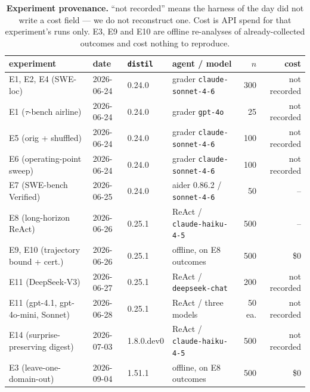 \documentclass[11pt]{article}
\newcommand{\sweEsevenTotalCost}{--}}
\newcommand{\sweEeightTotalCost}{--}}
\begin{document}
\begin{table}[t]
\centering\small
\caption{\textbf{Experiment provenance.} ``not recorded'' means the harness of the day did
not write a cost field --- we do not reconstruct one. Cost is API spend for that
experiment's runs only. E3, E9 and E10 are offline re-analyses of already-collected
outcomes and cost nothing to reproduce.}
\label{tab:provenance}
\begin{tabular}{@{}llllrr@{}}
\toprule
experiment & date & \texttt{distil} & agent / model & $n$ & cost \\
\midrule
E1, E2, E4 (SWE-loc) & 2026-06-24 & 0.24.0 & grader \texttt{claude-sonnet-4-6} & 300 & not recorded \\
E1 ($\tau$-bench airline) & 2026-06-24 & 0.24.0 & grader \texttt{gpt-4o} & 25 & not recorded \\
E5 (orig + shuffled) & 2026-06-24 & 0.24.0 & grader \texttt{claude-sonnet-4-6} & 100 & not recorded \\
E6 (operating-point sweep) & 2026-06-24 & 0.24.0 & grader \texttt{claude-sonnet-4-6} & 100 & not recorded \\
E7 (SWE-bench Verified) & 2026-06-25 & 0.24.0 & aider 0.86.2 / \texttt{sonnet-4-6} & 50 & \sweEsevenTotalCost \\
E8 (long-horizon ReAct) & 2026-06-26 & 0.25.1 & ReAct / \texttt{claude-haiku-4-5} & 500 & \sweEeightTotalCost \\
E9, E10 (trajectory bound + cert.) & 2026-06-26 & 0.25.1 & offline, on E8 outcomes & 500 & \$0 \\
E11 (DeepSeek-V3) & 2026-06-27 & 0.25.1 & ReAct / \texttt{deepseek-chat} & 200 & not recorded \\
E11 (gpt-4.1, gpt-4o-mini, Sonnet) & 2026-06-28 & 0.25.1 & ReAct / three models & 50 ea. & not recorded \\
E14 (surprise-preserving digest) & 2026-07-03 & 1.8.0.dev0 & ReAct / \texttt{claude-haiku-4-5} & 500 & not recorded \\
E3 (leave-one-domain-out) & 2026-09-04 & 1.51.1 & offline, on E8 outcomes & 500 & \$0 \\
\bottomrule
\end{tabular}
\end{table}
\end{document}
